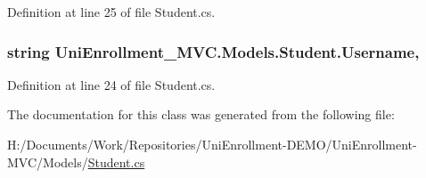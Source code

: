 Definition at line 25 of file Student.\+cs.

\subsubsection[{\texorpdfstring{Username}{Username}}]{\setlength{\rightskip}{0pt plus 5cm}string Uni\+Enrollment\+\_\+\+M\+V\+C.\+Models.\+Student.\+Username\hspace{0.3cm}{\ttfamily [get]}, {\ttfamily [set]}}\hypertarget{class_uni_enrollment___m_v_c_1_1_models_1_1_student_a58b520c5e708debc5604ed96caa8fa3f}{}\label{class_uni_enrollment___m_v_c_1_1_models_1_1_student_a58b520c5e708debc5604ed96caa8fa3f}


Definition at line 24 of file Student.\+cs.



The documentation for this class was generated from the following file\+:\begin{DoxyCompactItemize}
\item 
H\+:/\+Documents/\+Work/\+Repositories/\+Uni\+Enrollment-\/\+D\+E\+M\+O/\+Uni\+Enrollment-\/\+M\+V\+C/\+Models/\hyperlink{_student_8cs}{Student.\+cs}\end{DoxyCompactItemize}
